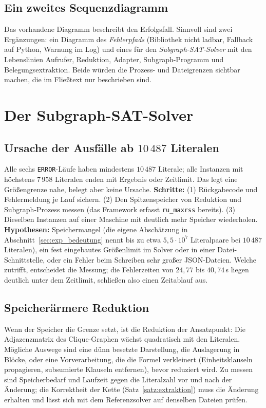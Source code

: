 \subsection{Ein zweites Sequenzdiagramm}

Das vorhandene Diagramm beschreibt den Erfolgsfall. Sinnvoll sind zwei Ergänzungen: ein Diagramm des \emph{Fehlerpfads} (Bibliothek nicht ladbar, Fallback auf Python, Warnung im Log) und eines für den \emph{Subgraph-SAT-Solver} mit den Lebenslinien Aufrufer, Reduktion, Adapter, Subgraph-Programm und Belegungsextraktion. Beide würden die Prozess- und Dateigrenzen sichtbar machen, die im Fließtext nur beschrieben sind.

\section{Der Subgraph-SAT-Solver}

\subsection{Ursache der Ausfälle ab $10\,487$ Literalen}

Alle sechs \texttt{ERROR}-Läufe haben mindestens $10\,487$ Literale; alle Instanzen mit höchstens $7\,958$ Literalen enden mit Ergebnis oder Zeitlimit. Das legt eine Größengrenze nahe, belegt aber keine Ursache. \textbf{Schritte:} (1) Rückgabecode und Fehlermeldung je Lauf sichern. (2) Den Spitzenspeicher von Reduktion und Subgraph-Prozess messen (das Framework erfasst \texttt{ru\_maxrss} bereits). (3) Dieselben Instanzen auf einer Maschine mit deutlich mehr Speicher wiederholen. \textbf{Hypothesen:} Speichermangel (die eigene Abschätzung in Abschnitt~\ref{sec:exp_bedeutung} nennt bis zu etwa $5{,}5\cdot10^{7}$ Literalpaare bei $10\,487$ Literalen), ein fest eingebautes Größenlimit im Solver oder in einer Datei-Schnittstelle, oder ein Fehler beim Schreiben sehr großer JSON-Dateien. Welche zutrifft, entscheidet die Messung; die Fehlerzeiten von $24{,}77$ bis $40{,}74$\,s liegen deutlich unter dem Zeitlimit, schließen also einen Zeitablauf aus.

\subsection{Speicherärmere Reduktion}

Wenn der Speicher die Grenze setzt, ist die Reduktion der Ansatzpunkt: Die Adjazenzmatrix des Clique-Graphen wächst quadratisch mit den Literalen. Mögliche Auswege sind eine dünn besetzte Darstellung, die Auslagerung in Blöcke, oder eine Vorverarbeitung, die die Formel verkleinert (Einheitsklauseln propagieren, subsumierte Klauseln entfernen), bevor reduziert wird. Zu messen sind Speicherbedarf und Laufzeit gegen die Literalzahl vor und nach der Änderung; die Korrektheit der Kette (Satz~\ref{satz:extraktion}) muss die Änderung erhalten und lässt sich mit dem Referenzsolver auf denselben Dateien prüfen.

